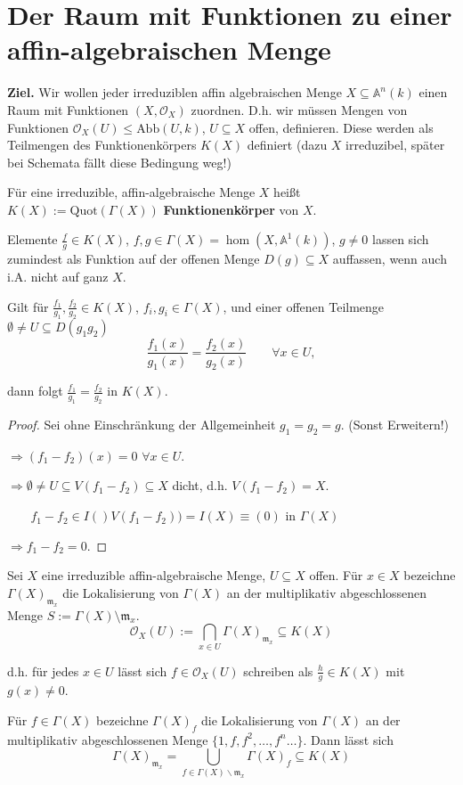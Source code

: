 
\section{Der Raum mit Funktionen zu einer affin-algebraischen Menge}
\label{sec:alg-mengen-raeume-mit-fkt}

\textbf{Ziel.} Wir wollen jeder irreduziblen affin algebraischen Menge $X\subseteq\mathbb{A}^{n}(k)$ einen Raum mit Funktionen $(X,\mathcal{O}_{X})$ zuordnen.
D.h. wir müssen Mengen von Funktionen $\mathcal{O}_{X}(U) \leq \text{Abb}(U,k)$,
$U\subseteq X$ offen, definieren. Diese werden als Teilmengen des Funktionenkörpers
$K(X)$ definiert (dazu $X$ irreduzibel, später bei Schemata fällt
diese Bedingung weg!)
\begin{defn}
  \label{def:funktionenkoerper}
  Für eine irreduzible, affin-algebraische Menge $X$ heißt $K(X):=\text{Quot}(\Gamma(X))$ \textbf{Funktionenkörper} von $X$.

  Elemente $\frac{f}{g}\in K(X)$, $f,g\in\Gamma(X)=\hom(X,\mathbb{A}^{1}(k))$,
  $g\neq0$ lassen sich zumindest als Funktion auf der offenen Menge
  $D(g)\subseteq X$ auffassen, wenn auch i.A. nicht auf ganz
  $X$.
\end{defn}
\begin{lem}
  \label{lem:gleichheit-im-funktionenkoerper}
  Gilt für $\frac{f_{1}}{g_{1}},\frac{f_{2}}{g_{2}}\in K(X)$, $f_{i},g_{i}\in\Gamma(X)$,
  und einer offenen Teilmenge $\emptyset\neq U\subseteq D(g_{1}g_{2})$
  \[
    \frac{f_{1}(x)}{g_{1}(x)}=\frac{f_{2}(x)}{g_{2}(x)}\qquad\forall x\in U,
  \]

  dann folgt $\frac{f_{1}}{g_{1}}=\frac{f_{2}}{g_{2}}$ in $K(X)$.
\end{lem}
\begin{proof}
  Sei ohne Einschränkung der Allgemeinheit $g_{1}=g_{2}=g$. (Sonst
  Erweitern!) 

  $\Rightarrow(f_{1}-f_{2})(x)=0$ $\forall x\in U$.

  $\Rightarrow\emptyset\neq U\subseteq V(f_{1}-f_{2})\subseteq X$ dicht,
  d.h. $V(f_{1}-f_{2})=X$.

  $\phantom{\Rightarrow }$ $f_{1}-f_{2}\in I()V(f_{1}-f_{2}))=I(X)\equiv(0)$
  in $\Gamma(X)$ 

  $\Rightarrow f_{1}-f_{2}=0$.
\end{proof}
\begin{defn}
  \label{def:alg-menge-als-raum-mit-fkt}
  Sei $X$ eine irreduzible affin-algebraische Menge, $U\subseteq X$
  offen. Für $x \in X$ bezeichne $\Gamma(X)_{\mathfrak{m}_{x}}$ die Lokalisierung von $\Gamma(X)$ an der multiplikativ abgeschlossenen Menge $S := \Gamma(X) \setminus \mathfrak{m}_{x}$.
  \[
    \mathcal{O}_{X}(U):=\bigcap_{x\in U}\Gamma(X)_{\mathfrak{m}_{x}}\subseteq K(X)
  \]

  d.h. für jedes $x\in U$ lässt sich $f\in\mathcal{O}_{X}(U)$ schreiben
  als $\frac{h}{g} \in K(X)$ mit $g(x)\neq0$.
\end{defn}
Für $f\in\Gamma(X)$ bezeichne $\Gamma(X)_{f}$ die Lokalisierung
von $\Gamma(X)$ an der multiplikativ abgeschlossenen Menge
$\{1,f,f^{2},\ldots,f^{n}\ldots\}$. Dann lässt sich
\[
  \Gamma(X)_{\mathfrak{m}_{x}}=\bigcup_{f\in\Gamma(X)\backslash\mathfrak{m}_{x}}\Gamma(X)_{f}\subseteq K(X)
\]

